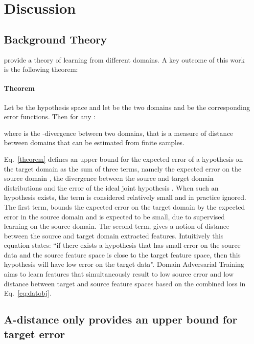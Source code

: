\documentclass[11pt]{article}
\begin{document}
\section{Discussion}
\label{discussion}
\subsection{Background Theory}

\citet{ben2007analysis, ben2010theory} provide a theory of learning from different domains.
A key outcome of this work is the following theorem:

\paragraph{Theorem}\citep{ben2007analysis, ben2010theory}
\label{theorem:paragraph}
 Let  be the hypothesis space and let  be the two domains and  be the corresponding error functions. Then for any :


where   is the -divergence \citep{kifer2004detecting} between two domains, that is a measure of distance between domains that can be estimated from finite samples.

Eq.~\ref{theorem} defines an upper bound for the expected error  of a hypothesis  on the target domain as the sum of three terms, namely the expected error on the source domain , the divergence between the source and target domain distributions  and the error of the ideal joint hypothesis . When such an hypothesis exists, the term is considered relatively small and in practice ignored.
The first term, bounds the expected error on the target domain by the expected error in the source domain and is expected to be small, due to supervised learning on the source domain. The second term, gives a notion of distance between the source and target domain extracted features. 
Intuitively this equation states: ``if there exists a hypothesis  that has small error on the source data and the source feature space is close to the target feature space, then this hypothesis will have low error on the target data''. Domain Adversarial Training aims to learn features that simultaneously result to low source error and low distance between target and source feature spaces based on the combined loss in Eq.~\ref{eq:datobj}.

\subsection{A-distance only provides an upper bound for target error}
\end{document}
